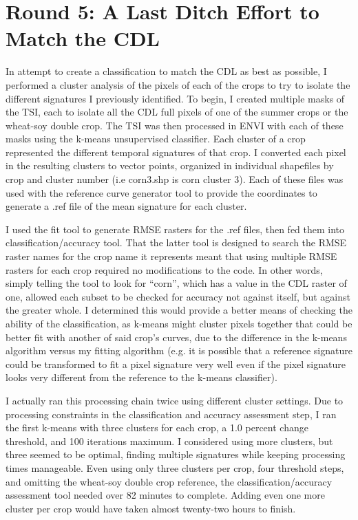 \section{Round 5: A Last Ditch Effort to Match the CDL}


In attempt to create a classification to match the CDL as best as possible, I performed a cluster analysis of the pixels of each of the crops to try to isolate the different signatures I previously identified. To begin, I created multiple masks of the TSI, each to isolate all the CDL full pixels of one of the summer crops or the wheat-soy double crop. The TSI was then processed in ENVI with each of these masks using the k-means unsupervised classifier. Each cluster of a crop represented the different temporal signatures of that crop. I converted each pixel in the resulting clusters to vector points, organized in individual shapefiles by crop and cluster number (i.e corn3.shp is corn cluster 3). Each of these files was used with the reference curve generator tool to provide the coordinates to generate a .ref file of the mean signature for each cluster.

I used the fit tool to generate RMSE rasters for the .ref files, then fed them into classification/accuracy tool. That the latter tool is designed to search the RMSE raster names for the crop name it represents meant that using multiple RMSE rasters for each crop required no modifications to the code. In other words, simply telling the tool to look for “corn”, which has a value in the CDL raster of one, allowed each subset to be checked for accuracy not against itself, but against the greater whole. I determined this would provide a better means of checking the ability of the classification, as k-means might cluster pixels together that could be better fit with another of said crop’s curves, due to the difference in the k-means algorithm versus my fitting algorithm (e.g. it is  possible that a reference signature could be transformed to fit a pixel signature very well even if the pixel signature looks very different from the reference to the k-means classifier).

I actually ran this processing chain twice using different cluster settings. Due to processing constraints in the classification and accuracy assessment step, I ran the first k-means with three clusters for each crop, a 1.0 percent change threshold, and 100 iterations maximum. I considered using more clusters, but three seemed to be optimal, finding multiple signatures while keeping processing times manageable. Even using only three clusters per crop, four threshold steps, and omitting the wheat-soy double crop reference, the classification/accuracy assessment tool needed over 82 minutes to complete. Adding even one more cluster per crop would have taken almost twenty-two hours to finish.

